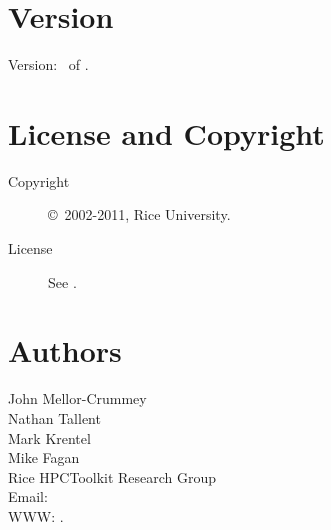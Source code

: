 \documentclass[english]{article}
\begin{document}
\section{Version}

Version: \Version\ of \Date.

\section{License and Copyright}

\begin{description}
\item[Copyright] \copyright\ 2002-2011, Rice University.
\item[License] See .
\end{description}

\section{Authors}

\noindent
John Mellor-Crummey \\
Nathan Tallent \\
Mark Krentel \\
Mike Fagan \\
Rice HPCToolkit Research Group \\
Email:  \\
WWW: .

\LatexManEnd
\end{document}
